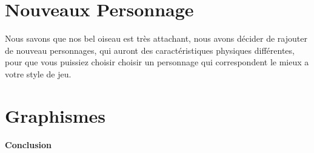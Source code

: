 \documentclass [11pt]{report}
\begin{document}
	\section{Nouveaux Personnage}
	Nous savons que nos bel oiseau est très attachant, nous avons décider de rajouter de nouveau personnages, qui auront des caractéristiques physiques différentes, pour que vous puissiez choisir choisir un personnage qui correspondent le mieux a votre style de jeu.
	
	
	\section{Graphismes}
\newpage
\textbf{{\huge Conclusion}}
\end{document}
